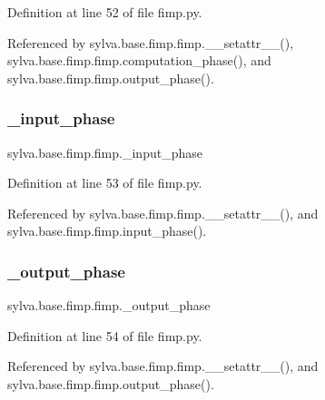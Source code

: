 Definition at line 52 of file fimp.\+py.



Referenced by sylva.\+base.\+fimp.\+fimp.\+\_\+\+\_\+setattr\+\_\+\+\_\+(), sylva.\+base.\+fimp.\+fimp.\+computation\+\_\+phase(), and sylva.\+base.\+fimp.\+fimp.\+output\+\_\+phase().

\mbox{\label{classsylva_1_1base_1_1fimp_1_1fimp_accafc4753ff5abcd3b21b46d7d66a60d}} 
\subsubsection{\texorpdfstring{\+\_\+input\+\_\+phase}{\_input\_phase}}
{\footnotesize\ttfamily sylva.\+base.\+fimp.\+fimp.\+\_\+input\+\_\+phase\hspace{0.3cm}{\ttfamily [private]}}



Definition at line 53 of file fimp.\+py.



Referenced by sylva.\+base.\+fimp.\+fimp.\+\_\+\+\_\+setattr\+\_\+\+\_\+(), and sylva.\+base.\+fimp.\+fimp.\+input\+\_\+phase().

\mbox{\label{classsylva_1_1base_1_1fimp_1_1fimp_ae26cf19440b7c972c813885660f44e55}} 
\subsubsection{\texorpdfstring{\+\_\+output\+\_\+phase}{\_output\_phase}}
{\footnotesize\ttfamily sylva.\+base.\+fimp.\+fimp.\+\_\+output\+\_\+phase\hspace{0.3cm}{\ttfamily [private]}}



Definition at line 54 of file fimp.\+py.



Referenced by sylva.\+base.\+fimp.\+fimp.\+\_\+\+\_\+setattr\+\_\+\+\_\+(), and sylva.\+base.\+fimp.\+fimp.\+output\+\_\+phase().

